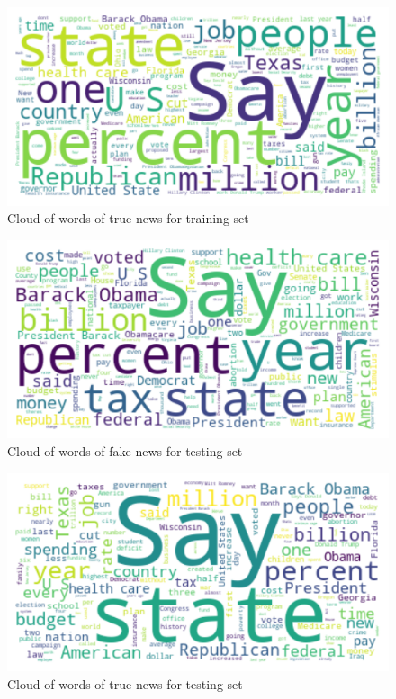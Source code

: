 \begin{figure}[H]
\centering
\includegraphics[width=0.7\linewidth]{wordcloud_train_true.png}
\caption{Cloud of words of true news for training set}
\label{wordcloud_train_true}
\end{figure}

\begin{figure}[H]
\centering
\includegraphics[width=0.7\linewidth]{wordcloud_test_fake.png}
\caption{Cloud of words of fake news for testing set}
\label{wordcloud_test_fake}
\end{figure}

\begin{figure}[H]
\centering
\includegraphics[width=0.7\linewidth]{wordcloud_test_true.png}
\caption{Cloud of words of true news for testing set}
\label{wordcloud_test_true}
\end{figure}